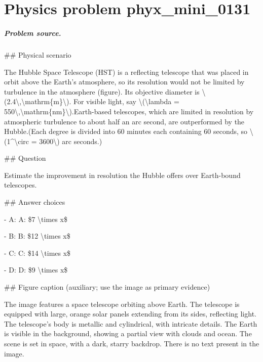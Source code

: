 
\chapter{Physics problem phyx\_mini\_0131}
\label{ch:PhyXMiniProblems_problem_phyx_mini_0131}

\paragraph{Problem source.}
\#\# Physical scenario

The Hubble Space Telescope (HST) is a reflecting telescope that was placed in orbit above the Earth's atmosphere, so its resolution would not be limited by turbulence in the atmosphere (figure). Its objective diameter is \textbackslash{}(2.4\textbackslash{},\textbackslash{}mathrm\{m\}\textbackslash{}). For visible light, say \textbackslash{}(\textbackslash{}lambda = 550\textbackslash{},\textbackslash{}mathrm\{nm\}\textbackslash{}).Earth-based telescopes, which are limited in resolution by atmospheric turbulence to about half an arc second, are outperformed by the Hubble.(Each degree is divided into 60 minutes each containing 60 seconds, so \textbackslash{}(1\textasciicircum{}\textbackslash{}circ = 3600\textbackslash{}) arc seconds.)

\#\# Question

Estimate the improvement in resolution the Hubble offers over Earth-bound telescopes.

\#\# Answer choices

- A: A: \$7 \textbackslash{}times x\$

- B: B: \$12 \textbackslash{}times x\$

- C: C: \$14 \textbackslash{}times x\$

- D: D: \$9 \textbackslash{}times x\$

\#\# Figure caption (auxiliary; use the image as primary evidence)

The image features a space telescope orbiting above Earth. The telescope is equipped with large, orange solar panels extending from its sides, reflecting light. The telescope's body is metallic and cylindrical, with intricate details. The Earth is visible in the background, showing a partial view with clouds and ocean. The scene is set in space, with a dark, starry backdrop. There is no text present in the image.

